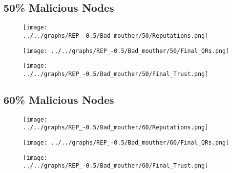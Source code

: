 \begin{minipage}[t]{0.49\columnwidth}
\subsection*{50\% Malicious Nodes}
    \begin{figure}[H]
        \centering
        \texttt{[image: ../../graphs/REP\_-0.5/Bad\_mouther/50/Reputations.png]}
    \end{figure}
    \begin{figure}[H]
        \centering
        \texttt{[image: ../../graphs/REP\_-0.5/Bad\_mouther/50/Final\_QRs.png]}
    \end{figure}
\end{minipage}
\begin{minipage}[t]{0.49\columnwidth}
    \begin{figure}[H]
        \centering
        \texttt{[image: ../../graphs/REP\_-0.5/Bad\_mouther/50/Final\_Trust.png]}
    \end{figure}
\end{minipage}

\begin{minipage}[t]{0.49\columnwidth}
\subsection*{60\% Malicious Nodes}
    \begin{figure}[H]
        \centering
        \texttt{[image: ../../graphs/REP\_-0.5/Bad\_mouther/60/Reputations.png]}
    \end{figure}
    \begin{figure}[H]
        \centering
        \texttt{[image: ../../graphs/REP\_-0.5/Bad\_mouther/60/Final\_QRs.png]}
    \end{figure}
\end{minipage}
\begin{minipage}[t]{0.49\columnwidth}
    \begin{figure}[H]
        \centering
        \texttt{[image: ../../graphs/REP\_-0.5/Bad\_mouther/60/Final\_Trust.png]}
    \end{figure}
\end{minipage}

